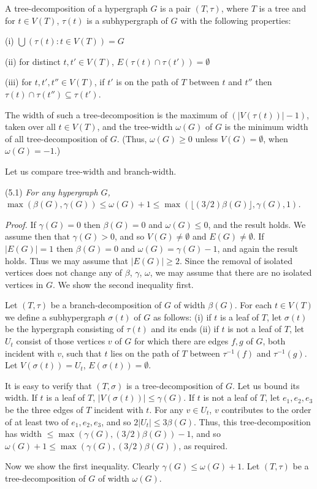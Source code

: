
A tree-decomposition of a hypergraph $G$ is a pair $(T, \tau)$, where $T$ is a tree and for $t \in V(T)$, $\tau(t)$ is a subhypergraph of $G$ with the following properties:

\hspace*{12pt}(i) $\bigcup (\tau(t) : t \in V(T)) = G$

\hspace*{12pt}(ii) for distinct $t, t' \in V(T)$, $E(\tau(t) \cap \tau(t')) = \emptyset$

\hspace*{12pt}(iii) for $t, t', t'' \in V(T)$, if $t'$ is on the path of $T$ between $t$ and $t''$ then $\tau(t) \cap \tau(t'') \subseteq \tau(t')$.

The width of such a tree-decomposition is the maximum of $(|V(\tau(t))| - 1)$, taken over all $t \in V(T)$, and the tree-width $\omega(G)$ of $G$ is the minimum width of all tree-decomposition of $G$. (Thus, $\omega(G) \ge 0$ unless $V(G) = \emptyset$, when $\omega(G) = -1$.)

Let us compare tree-width and branch-width.

\stmt
(5.1) \textit{For any hypergraph $G$, $\max(\beta(G), \gamma(G)) \le \omega(G) + 1 \le \max(\lfloor(3/2) \beta(G)\rfloor, \gamma(G), 1)$.}

\textit{Proof.} If $\gamma(G) = 0$ then $\beta(G) = 0$ and $\omega(G) \le 0$, and the result holds. We assume then that $\gamma(G) > 0$, and so $V(G) \ne \emptyset$ and $E(G) \ne \emptyset$. If $|E(G)| = 1$ then $\beta(G) = 0$ and $\omega(G) = \gamma(G) - 1$, and again the result holds. Thus we may assume that $|E(G)| \ge 2$. Since the removal of isolated vertices does not change any of $\beta$, $\gamma$, $\omega$, we may assume that there are no isolated vertices in $G$. We show the second inequality first.

Let $(T, \tau)$ be a branch-decomposition of $G$ of width $\beta(G)$. For each $t \in V(T)$ we define a subhypergraph $\sigma(t)$ of $G$ as follows: (i) if $t$ is a leaf of $T$, let $\sigma(t)$ be the hypergraph consisting of $\tau(t)$ and its ends (ii) if $t$ is not a leaf of $T$, let $U_t$ consist of those vertices $v$ of $G$ for which there are edges $f, g$ of $G$, both incident with $v$, such that $t$ lies on the path of $T$ between $\tau^{-1}(f)$ and $\tau^{-1}(g)$. Let $V(\sigma(t)) = U_t$, $E(\sigma(t)) = \emptyset$.

It is easy to verify that $(T, \sigma)$ is a tree-decomposition of $G$. Let us bound its width. If $t$ is a leaf of $T$, $|V(\sigma(t))| \le \gamma(G)$. If $t$ is not a leaf of $T$, let $e_1, e_2, e_3$ be the three edges of $T$ incident with $t$. For any $v \in U_t$, $v$ contributes to the order of at least two of $e_1, e_2, e_3$, and so $2 |U_t| \le 3\beta(G)$. Thus, this tree-decomposition has width $\le \max(\gamma(G), (3/2) \beta(G)) - 1$, and so $\omega(G) + 1 \le \max(\gamma(G), (3/2) \beta(G))$, as required.

Now we show the first inequality. Clearly $\gamma(G) \le \omega(G) + 1$. Let $(T, \tau)$ be a tree-decomposition of $G$ of width $\omega(G)$.
